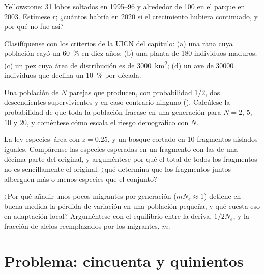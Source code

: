 \begin{exercise}[$\star\star$]\label{exo:b3:conservation-biology:8}
Yellowstone: 31 lobos soltados en 1995--96 y alrededor de 100 en el
parque en 2003. Estímese $r$; ¿cuántos habría en 2020 si el crecimiento
hubiera continuado, y por qué no fue así?
\end{exercise}

\begin{exercise}[$\star\star$]\label{exo:b3:conservation-biology:9}
Clasifíquense con los criterios de la UICN del capítulo: (a) una rana
cuya población cayó un \qty{60}{\%} en diez años; (b) una planta de 180
individuos maduros; (c) un pez cuya área de distribución es de
\qty{3000}{km^2}; (d) un ave de \num{30000} individuos que declina un
\qty{10}{\%} por década.
\end{exercise}

\begin{exercise}[$\star\star\star$]\label{exo:b3:conservation-biology:10}
Una población de $N$ parejas que producen, con probabilidad $1/2$, dos
descendientes supervivientes y en caso contrario ninguno
(). Calcúlese la probabilidad de que toda la
población fracase en una generación para $N = 2$, $5$, $10$ y $20$, y
coméntese cómo escala el riesgo demográfico con $N$.
\end{exercise}

\begin{exercise}[$\star\star\star$]\label{exo:b3:conservation-biology:11}
La ley especies--área con $z = 0.25$, y un bosque cortado en 10
fragmentos aislados iguales. Compárense las especies esperadas en un
fragmento con las de una décima parte del original, y arguméntese por
qué el total de todos los fragmentos no es sencillamente el original:
¿qué determina que los fragmentos juntos alberguen más o menos especies
que el conjunto?
\end{exercise}

\begin{exercise}[$\star\star\star$]\label{exo:b3:conservation-biology:12}
¿Por qué añadir unos pocos migrantes por generación ($m N_{e} \approx 1$)
detiene en buena medida la pérdida de variación en una población
pequeña, y qué cuesta eso en adaptación local? Arguméntese con el
equilibrio entre la deriva, $1/2N_{e}$, y la fracción de alelos
reemplazados por los migrantes, $m$.
\end{exercise}

\section{Problema: cincuenta y quinientos}

